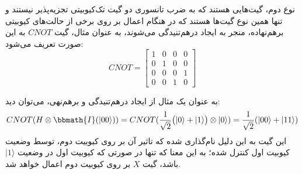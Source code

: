 نوع دوم، گیت‌هایی هستند که به ضرب تانسوری دو گیت تک‌کیوبیتی تجزیه‌پذیر نیستند و تنها همین نوع گیت‌ها هستند که در هنگام اعمال بر روی برخی از حالت‌های کیوبیتی برهم‌نهاده، منجر به ایجاد درهم‌تنیدگی می‌شوند، به عنوان مثال، گیت
$CNOT$
به این صورت تعریف می‌شود:
\begin{equation}
    CNOT = \begin{bmatrix}
    1 & 0 & 0 & 0 \\[3pt]
    0 & 1 & 0 & 0 \\[3pt]
    0 & 0 & 0 & 1 \\[3pt]
    0 & 0 & 1 & 0 
    \end{bmatrix}
\end{equation}

به عنوان یک مثال از ایجاد درهم‌تنیدگی و برهم‌نهی، می‌توان دید:
\begin{equation}
    CNOT(H \otimes \bbmath{I}(|00\rangle)) = CNOT(\frac{1}{\sqrt{2}} \big( |0\rangle + |1\rangle \big) \otimes |0\rangle ) = \frac{1}{\sqrt{2}} (|00\rangle + |11\rangle)
\end{equation}
این گیت به این دلیل نام‌گذاری شده که تاثیر آن بر روی کیوبیت دوم، توسط وضعیت کیوبیت اول کنترل شده؛ به این معنا که تنها در صورتی که کیوبیت اول در وضعیت
$|1\rangle$
باشد، گیت 
$X$
بر روی کیوبیت دوم اعمال خواهد شد.

